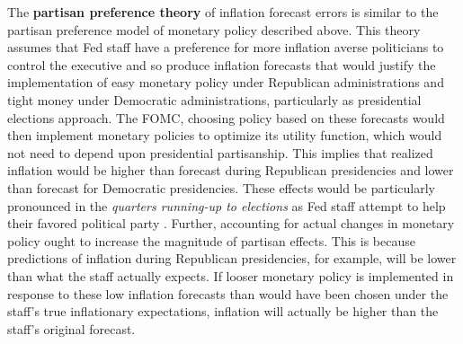 \documentclass[a4paper]{article}
\begin{document}
\begin{figure}
\begin{center}
  \end{center}
\end{figure}




The {\bf{partisan preference theory}} of inflation forecast errors is similar to the partisan preference model of monetary policy described above. This theory assumes that Fed staff have a preference for more inflation averse politicians to control the executive and so produce inflation forecasts that would justify the implementation of easy monetary policy under Republican administrations and tight money under Democratic administrations, particularly as presidential elections approach. The FOMC, choosing policy based on these forecasts would then implement monetary policies to optimize its utility function, which would not need to depend upon presidential partisanship. This implies that realized inflation would be higher than forecast during Republican presidencies and lower than forecast for Democratic presidencies. These effects would be particularly pronounced in the {\emph{quarters running-up to elections}} as Fed staff attempt to help their favored political party \citep{Beck1987,Grier1987}. Further, accounting for actual changes in monetary policy ought to increase the magnitude of partisan effects. This is because predictions of inflation during Republican presidencies, for example, will be lower than what the staff actually expects. If looser monetary policy is implemented in response to these low inflation forecasts than would have been chosen under the staff's true inflationary expectations, inflation will actually be higher than the staff's original forecast.
\end{document}
